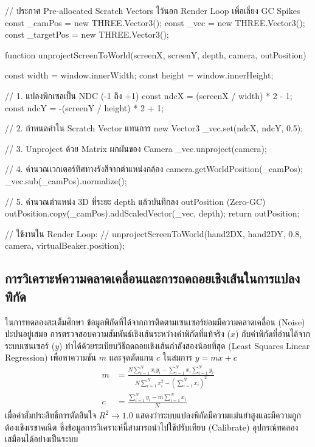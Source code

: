 \begin{codebox}
// ประกาศ Pre-allocated Scratch Vectors ไว้นอก Render Loop เพื่อเลี่ยง GC Spikes
const _camPos = new THREE.Vector3();
const _vec = new THREE.Vector3();
const _targetPos = new THREE.Vector3();

function unprojectScreenToWorld(screenX, screenY, depth, camera, outPosition) {
    const width = window.innerWidth;
    const height = window.innerHeight;

    // 1. แปลงพิกเซลเป็น NDC (-1 ถึง +1)
    const ndcX = (screenX / width) * 2 - 1;
    const ndcY = -(screenY / height) * 2 + 1;

    // 2. กำหนดค่าใน Scratch Vector แทนการ new Vector3
    _vec.set(ndcX, ndcY, 0.5);

    // 3. Unproject ด้วย Matrix ผกผันของ Camera
    _vec.unproject(camera);

    // 4. คำนวณเวกเตอร์ทิศทางรังสีจากตำแหน่งกล้อง
    camera.getWorldPosition(_camPos);
    _vec.sub(_camPos).normalize();

    // 5. คำนวณตำแหน่ง 3D ที่ระยะ depth แล้วบันทึกลง outPosition (Zero-GC)
    outPosition.copy(_camPos).addScaledVector(_vec, depth);
    return outPosition;
}

// ใช้งานใน Render Loop:
// unprojectScreenToWorld(hand2DX, hand2DY, 0.8, camera, virtualBeaker.position);
\end{codebox}

\subsection{การวิเคราะห์ความคลาดเคลื่อนและการถดถอยเชิงเส้นในการแปลงพิกัด}

ในการทดลองสะเต็มศึกษา ข้อมูลพิกัดที่ได้จากการติดตามเซนเซอร์ย่อมมีความคลาดเคลื่อน (Noise) ปะปนอยู่เสมอ การตรวจสอบความสัมพันธ์เชิงเส้นระหว่างค่าพิกัดที่แท้จริง ($x$) กับค่าพิกัดที่อ่านได้จากระบบเซนเซอร์ ($y$) ทำได้ด้วยระเบียบวิธีถดถอยเชิงเส้นกำลังสองน้อยที่สุด (Least Squares Linear Regression) เพื่อหาความชัน $m$ และจุดตัดแกน $c$ ในสมการ $y = mx + c$
\begin{align}
m &= \frac{N \sum_{i=1}^N x_i y_i - \sum_{i=1}^N x_i \sum_{i=1}^N y_i}{N \sum_{i=1}^N x_i^2 - \left(\sum_{i=1}^N x_i\right)^2} \label{eq:linear_slope} \\
c &= \frac{\sum_{i=1}^N y_i - m \sum_{i=1}^N x_i}{N} \label{eq:linear_intercept}
\end{align}
เมื่อค่าสัมประสิทธิ์การตัดสินใจ $R^2 \to 1.0$ แสดงว่าระบบแปลงพิกัดมีความแม่นยำสูงและมีความถูกต้องเชิงเรขาคณิต ซึ่งข้อมูลการวิเคราะห์นี้สามารถนำไปใช้ปรับเทียบ (Calibrate) อุปกรณ์ทดลองเสมือนได้อย่างเป็นระบบ

